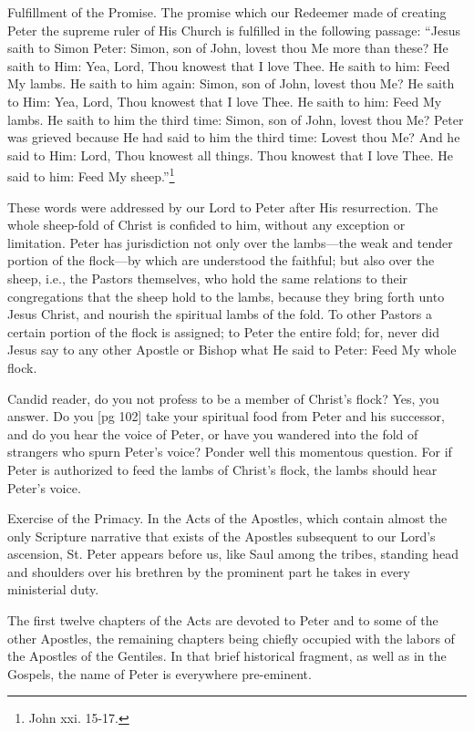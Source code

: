 Fulfillment of the Promise. The promise which
our Redeemer made of creating Peter the supreme
ruler of His Church is fulfilled in the following
passage: “Jesus saith to Simon Peter: Simon,
son of John, lovest thou Me more than these? He
saith to Him: Yea, Lord, Thou knowest that I
love Thee. He saith to him: Feed My lambs.
He saith to him again: Simon, son of John, lovest
thou Me? He saith to Him: Yea, Lord, Thou
knowest that I love Thee. He saith to him: Feed
My lambs. He saith to him the third time: Simon,
son of John, lovest thou Me? Peter was grieved
because He had said to him the third time: Lovest
thou Me? And he said to Him: Lord, Thou
knowest all things. Thou knowest that I love
Thee. He said to him: Feed My sheep.”\footnote{John
xxi. 15-17.}

These words were addressed by our Lord to
Peter after His resurrection. The whole sheep-fold
of Christ is confided to him, without any exception
or limitation. Peter has jurisdiction not
only over the lambs—the weak and tender portion
of the flock—by which are understood the faithful;
but also over the sheep, i.e., the Pastors
themselves, who hold the same relations to their
congregations that the sheep hold to the lambs,
because they bring forth unto Jesus Christ, and
nourish the spiritual lambs of the fold. To other
Pastors a certain portion of the flock is assigned;
to Peter the entire fold; for, never did Jesus say
to any other Apostle or Bishop what He said to
Peter: Feed My whole flock.

Candid reader, do you not profess to be a member
of Christ's flock? Yes, you answer. Do you
[pg 102]
take your spiritual food from Peter and his successor,
and do you hear the voice of Peter, or
have you wandered into the fold of strangers who
spurn Peter's voice? Ponder well this momentous
question. For if Peter is authorized to feed the
lambs of Christ's flock, the lambs should hear
Peter's voice.

Exercise of the Primacy. In the Acts of the
Apostles, which contain almost the only Scripture
narrative that exists of the Apostles subsequent
to our Lord's ascension, St. Peter appears before
us, like Saul among the tribes, standing head and
shoulders over his brethren by the prominent part
he takes in every ministerial duty.

The first twelve chapters of the Acts are devoted
to Peter and to some of the other Apostles,
the remaining chapters being chiefly occupied with
the labors of the Apostles of the Gentiles. In
that brief historical fragment, as well as in the
Gospels, the name of Peter is everywhere pre-eminent.

